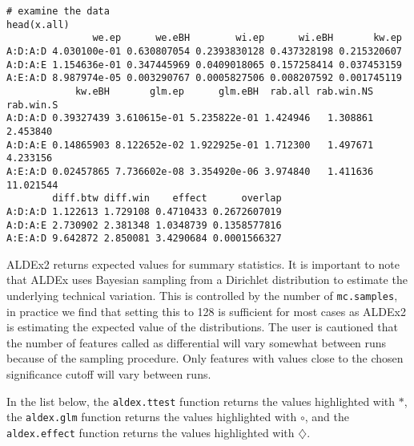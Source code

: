 \documentclass[11pt]{article}
\begin{document}
\newpage

\begin{verbatim}
# examine the data
head(x.all)
               we.ep      we.eBH        wi.ep      wi.eBH       kw.ep
A:D:A:D 4.030100e-01 0.630807054 0.2393830128 0.437328198 0.215320607
A:D:A:E 1.154636e-01 0.347445969 0.0409018065 0.157258414 0.037453159
A:E:A:D 8.987974e-05 0.003290767 0.0005827506 0.008207592 0.001745119
            kw.eBH       glm.ep      glm.eBH  rab.all rab.win.NS rab.win.S
A:D:A:D 0.39327439 3.610615e-01 5.235822e-01 1.424946   1.308861  2.453840
A:D:A:E 0.14865903 8.122652e-02 1.922925e-01 1.712300   1.497671  4.233156
A:E:A:D 0.02457865 7.736602e-08 3.354920e-06 3.974840   1.411636 11.021544
        diff.btw diff.win    effect      overlap
A:D:A:D 1.122613 1.729108 0.4710433 0.2672607019
A:D:A:E 2.730902 2.381348 1.0348739 0.1358577816
A:E:A:D 9.642872 2.850081 3.4290684 0.0001566327
\end{verbatim}

ALDEx2 returns expected values for summary statistics. It is important to note that ALDEx uses Bayesian sampling from a Dirichlet distribution to estimate  the underlying technical variation. This is controlled by the number of \texttt{mc.samples}, in practice we find that setting this to 128 is sufficient for most cases as ALDEx2 is estimating the expected value of the distributions\cite{fernandes:2014}. The user is cautioned that the number of features called as differential will vary somewhat between runs because of the sampling procedure. Only features with values close to the chosen significance cutoff will vary between runs. 

In the list below, the \texttt{aldex.ttest} function returns the values highlighted with $\ast$, the \texttt{aldex.glm} function returns the values highlighted with $\circ$, and the \texttt{aldex.effect} function returns the values highlighted with $\diamondsuit$. 
\end{document}
